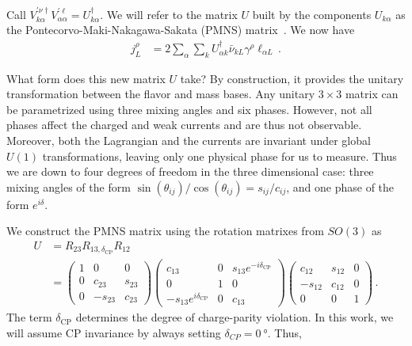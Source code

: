 Call $V^{\prime \nu \dagger}_{k \alpha}V^{\prime \ell}_{\alpha \alpha} = U^\dagger_{k \alpha}$. We will refer to the matrix $U$ built by the components $U_{k \alpha}$ as the
Pontecorvo-Maki-Nakagawa-Sakata (PMNS) matrix~\cite{pontecorvo1957,maki1962}. %
We now have 
\begin{align}\label{eq:j_CC3} %
    j^\rho_L &= 2 \sum_\alpha \sum_k U^\dagger_{\alpha k} \bar{\nu}_{k L} \gamma^\rho  \ell_{\alpha L}\,.
\end{align}

What form does this new matrix $U$ take? By construction, it provides the unitary transformation between the flavor and mass bases.
Any unitary $3\times3$ matrix can be parametrized using three mixing angles and six phases. However, not all phases affect the 
charged and weak currents and are thus not observable. Moreover, both the Lagrangian and the currents are invariant under global $U(1)$ transformations,
leaving only one physical phase for us to measure. Thus we are down to four degrees of freedom in the three dimensional case: three mixing angles
of the form $\sin{(\theta_{ij})}/\cos{(\theta_{ij})} = s_{ij}/c_{ij}$, and one phase of the form $e^{i\delta}$.

We construct the PMNS matrix using the rotation matrixes from $SO(3)$ as
\begin{align}\label{PMNS_def}
    U &= R_{23}R_{13,\delta_{\text{CP}}}R_{12} \nonumber \\
      & = 
    \begin{pmatrix}1 & 0 & 0 \\ 0 & c_{23} & s_{23} \\ 0 & -s_{23} & c_{23}\end{pmatrix}
\begin{pmatrix}c_{13} & 0 & s_{13} e^{-i \delta_{\mathrm{CP}}} \\ 0 & 1 & 0 \\ -s_{13} e^{i \delta_{\mathrm{CP}}} & 0 & c_{13}\end{pmatrix}
\begin{pmatrix}c_{12} & s_{12} & 0 \\ -s_{12} & c_{12} & 0 \\ 0 & 0 & 1\end{pmatrix}\,.
\end{align}
The term $\delta_\text{CP}$ determines the degree of charge-parity violation. In this work, we will assume CP invariance by always
setting $\delta_{CP} = \SI{0}{\degree}$. Thus,


